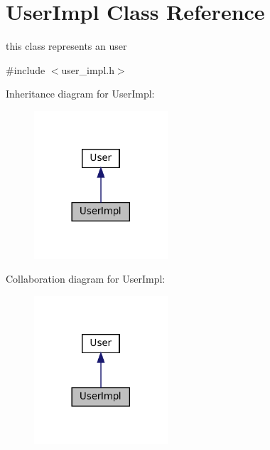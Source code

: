 \hypertarget{classUserImpl}{}\section{User\+Impl Class Reference}
\label{classUserImpl}


this class represents an user  




{\ttfamily \#include $<$user\+\_\+impl.\+h$>$}



Inheritance diagram for User\+Impl\+:
\nopagebreak
\begin{figure}[H]
\begin{center}
\leavevmode
\includegraphics[width=141pt]{classUserImpl__inherit__graph}
\end{center}
\end{figure}


Collaboration diagram for User\+Impl\+:
\nopagebreak
\begin{figure}[H]
\begin{center}
\leavevmode
\includegraphics[width=141pt]{classUserImpl__coll__graph}
\end{center}
\end{figure}
